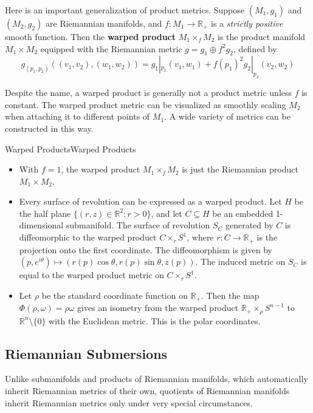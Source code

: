\documentclass[../main.tex]{subfiles}
\begin{document}
Here is an important generalization of product metrics. Suppose $(M_1, g_1)$ and $(M_2, g_2)$ are Riemannian manifolds, and $f: M_1 \to \mathbb{R}_+$ is a \emph{strictly positive} smooth function. Then the \textbf{warped product} $M_1 \times_f M_2$ is the product manifold $M_1 \times M_2$ equipped with the Riemannian metric $g = g_1 \oplus f^2 g_2$, defined by
\begin{equation}
	g_{(p_1, p_2)}((v_1, v_2), (w_1, w_2)) = g_1|_{p_1}(v_1, w_1) + f(p_1)^2 g_2|_{p_2}(v_2, w_2)
\end{equation}

\begin{remark}
	Despite the name, a warped product is generally not a product metric unless $f$ is constant. The warped product metric can be visualized as smoothly scaling $M_2$ when attaching it to different points of $M_1$. A wide variety of metrics can be constructed in this way.
\end{remark}

\begin{example}{Warped Products}{Warped Products}
	\begin{itemize}
		\item With $f=1$, the warped product $M_1 \times_f M_2$ is just the Riemannian product $M_1 \times M_2$.
		\item Every surface of revolution can be expressed as a warped product. Let $H$ be the half plane $\{(r, z) \in \mathbb{R}^2 : r > 0\}$, and let $C \subseteq H$ be an embedded 1-dimensional submanifold. The surface of revolution $S_C$ generated by $C$ is diffeomorphic to the warped product $C \times_r S^1$, where $r: C \to \mathbb{R}_+$ is the projection onto the first coordinate. The diffeomorphism is given by $(p, e^{i\theta}) \mapsto (r(p)\cos\theta, r(p)\sin\theta, z(p))$. The induced metric on $S_C$ is equal to the warped product metric on $C \times_r S^1$.
		\item Let $\rho$ be the standard coordinate function on $\mathbb{R}_+$. Then the map $\Phi(\rho, \omega) = \rho \omega$ gives an isometry from the warped product $\mathbb{R}_+ \times_\rho S^{n-1}$ to $\mathbb{R}^n \setminus \{0\}$ with the Euclidean metric. This is the polar coordinates.
	\end{itemize}
\end{example}

\subsection{Riemannian Submersions}
Unlike submanifolds and products of Riemannian manifolds, which automatically inherit Riemannian metrics of their own, quotients of Riemannian manifolds inherit Riemannian metrics only under very special circumstances.
\end{document}
